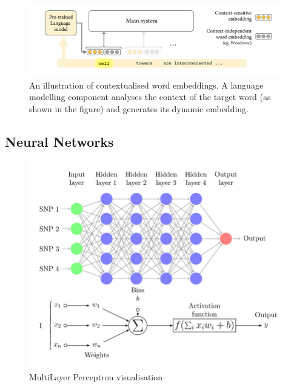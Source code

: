 \begin{figure}[htbp]
    \centering
    \includegraphics[width=0.9\linewidth]{images/contextualised_word_embeddings.png}
    \caption{An illustration of contextualised word embeddings. A language modelling component analyses the context of the target word (as shown in the figure) and generates its dynamic embedding. \cite{camacho-collados-2020-embeddings}}
    \label{fig:contextualised-word-embeddings}
\end{figure}


\subsection{Neural Networks}

\begin{figure}[htbp]
    \centering
    \includegraphics[width=0.9\linewidth]{images/mlp.png}
    \caption{MultiLayer Perceptron visualisation \cite{perez-enciso-2019-guide}}
    \label{fig:mlp}
\end{figure}

